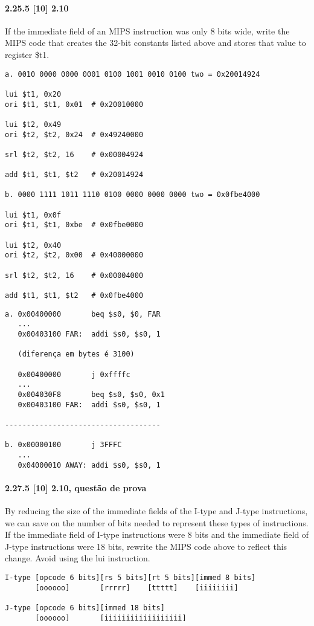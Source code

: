 \documentclass{article}
\begin{document}
\paragraph{2.25.5  [10] 2.10} If the immediate field of an MIPS instruction was 
only 8 bits wide, write the MIPS code that creates the 32-bit constants listed 
above and stores that value to register \$t1.

\begin{verbatim}
a. 0010 0000 0000 0001 0100 1001 0010 0100 two = 0x20014924

lui $t1, 0x20
ori $t1, $t1, 0x01  # 0x20010000

lui $t2, 0x49
ori $t2, $t2, 0x24  # 0x49240000

srl $t2, $t2, 16    # 0x00004924

add $t1, $t1, $t2   # 0x20014924

b. 0000 1111 1011 1110 0100 0000 0000 0000 two = 0x0fbe4000

lui $t1, 0x0f
ori $t1, $t1, 0xbe  # 0x0fbe0000

lui $t2, 0x40
ori $t2, $t2, 0x00  # 0x40000000

srl $t2, $t2, 16    # 0x00004000

add $t1, $t1, $t2   # 0x0fbe4000
\end{verbatim}


\pagebreak

\begin{verbatim}
a. 0x00400000       beq $s0, $0, FAR
   ...
   0x00403100 FAR:  addi $s0, $s0, 1

   (diferença em bytes é 3100)

   0x00400000       j 0xffffc
   ...
   0x004030F8       beq $s0, $s0, 0x1
   0x00403100 FAR:  addi $s0, $s0, 1

------------------------------------

b. 0x00000100       j 3FFFC
   ...
   0x04000010 AWAY: addi $s0, $s0, 1
\end{verbatim}

\paragraph{2.27.5 [10] 2.10, questão de prova} By reducing the size of the
immediate fields of the I-type and J-type instructions, we can save on the
number of bits needed to represent these types of instructions. If the immediate
field of I-type instructions were 8 bits and the immediate field of J-type
instructions were 18 bits, rewrite the MIPS code above to reflect this change.
Avoid using the lui instruction.

\begin{verbatim}
I-type [opcode 6 bits][rs 5 bits][rt 5 bits][immed 8 bits]
       [oooooo]       [rrrrr]    [ttttt]    [iiiiiiii]

J-type [opcode 6 bits][immed 18 bits]
       [oooooo]       [iiiiiiiiiiiiiiiiii]
\end{verbatim}
\end{document}
